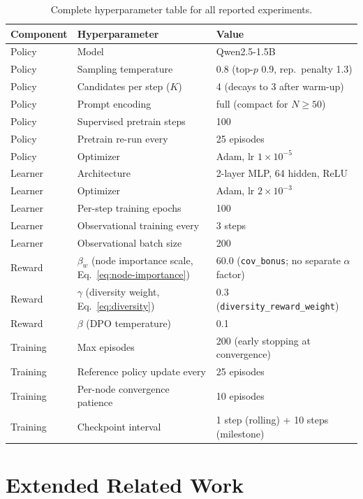 \documentclass[twoside]{article}
\theoremstyle{plain}
\theoremstyle{definition}
\theoremstyle{remark}
\begin{document}
\begin{table}[h]
\centering
\caption{Complete hyperparameter table for all reported experiments.}
\label{tab:hyper-summary}
\small
\begin{tabular}{@{}lll@{}}
\toprule
Component & Hyperparameter & Value \\
\midrule
Policy & Model & Qwen2.5-1.5B \\
Policy & Sampling temperature & 0.8 (top-$p$ 0.9, rep.\ penalty 1.3) \\
Policy & Candidates per step ($K$) & 4 (decays to 3 after warm-up) \\
Policy & Prompt encoding & full (compact for $N\!\geq\!50$) \\
Policy & Supervised pretrain steps & 100 \\
Policy & Pretrain re-run every & 25 episodes \\
Policy & Optimizer & Adam, lr $1 \times 10^{-5}$ \\
\midrule
Learner & Architecture & 2-layer MLP, 64 hidden, ReLU \\
Learner & Optimizer & Adam, lr $2 \times 10^{-3}$ \\
Learner & Per-step training epochs & 100 \\
Learner & Observational training every & 3 steps \\
Learner & Observational batch size & 200 \\
\midrule
Reward & $\beta_w$ (node importance scale, Eq.~\ref{eq:node-importance}) & 60.0 (\texttt{cov\_bonus}; no separate $\alpha$ factor) \\
Reward & $\gamma$ (diversity weight, Eq.~\ref{eq:diversity}) & 0.3 (\texttt{diversity\_reward\_weight}) \\
Reward & $\beta$ (DPO temperature) & 0.1 \\
\midrule
Training & Max episodes & 200 (early stopping at convergence) \\
Training & Reference policy update every & 25 episodes \\
Training & Per-node convergence patience & 10 episodes \\
Training & Checkpoint interval & 1 step (rolling) + 10 steps (milestone) \\
\bottomrule
\end{tabular}
\end{table}

\section{Extended Related Work}
\label{app:related-extended}
\end{document}
